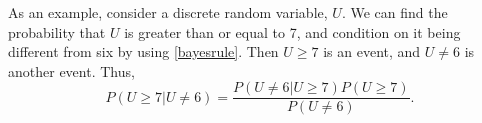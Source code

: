 \begin{comment}
\begin{theorem}[Bayes' Theorem]
\label{bayestheorem}
Consider two continuous random variables, $U$ and $\Theta$, that both have a nonzero probability. If both $P(U=u|\Theta=\theta)$ and $P(\Theta=\theta)$ exist for all $\theta$, then 
\begin{equation}
    \label{bayesrule}
    P(\Theta=\theta|U=u) = \frac{P(U=u|\Theta=\theta)P(\Theta=\theta)}{\int_{-\infty}^{\infty} P(U=u|\Theta=\theta)P(\Theta=\theta) \: \dd \theta}.
\end{equation}
$P(\Theta=\theta)$ is the prior probability/density of $\Theta$, and it represents the prior knowledge we have about that parameter. $P(\Theta=\theta|U=u)$ is called the posterior of $\Theta$, which is the probability density after we have observed that $U=u$ \citep{schay2016introduction}. 
\end{theorem}


From \eqref{lawoftotprob} we see that the denominator is the probability that $U=u$,
\begin{equation*}
    \int_{-\infty}^{\infty} P(U=u|\Theta=\theta)P(\Theta=\theta) \: \dd \theta = P(U=u).
\end{equation*}
Thus, Bayes' theorem can be reformulated as
\begin{equation}
    \label{Bayesrule2}
     P(\Theta=\theta|U=u) = \frac{P(U=u|\Theta=\theta)P(\Theta=\theta)}{P(U=u)}.
\end{equation}


As an example, consider a random variable $U$ that is binomial distributed with parameters $n$ and $\theta$. Thus,
\begin{equation*}
    U|\theta \sim \mathrm{Binomial}(n,\theta).
\end{equation*}
Using Theorem \ref{bayestheorem} and \eqref{Bayesrule2}, we get that the posterior probability of $\Theta|U$ is
\begin{equation*}
    P(\Theta=\theta|U=u) = \frac{P(U=u|\Theta=\theta)P(\Theta=\theta)}{P(U=u)}.
\end{equation*}

\end{comment}





As an example, consider a discrete random variable, $U$. We can find the probability that $U$ is greater than or equal to 7, and condition on it being different from six by using \eqref{bayesrule}. Then $U \geq 7$ is an event, and $U\neq6$ is another event. Thus,
\begin{equation}
    P(U\geq 7|U\neq6) = \frac{P(U\neq6|U\geq7)P(U\geq7)}{P(U\neq6)}.
\end{equation}



